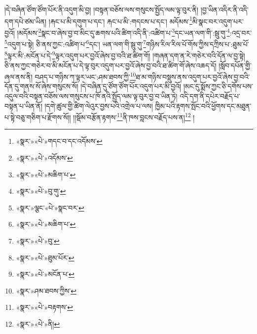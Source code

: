 །དེ་བཞིན་ཙོག་ཙོག་པོར་ནི་འདུག་མི་བྱ། །བསྟན་བཅོས་ལས་གསུངས་སྤྱོད་ལམ་ལྟ་བུར་ནི། །བྱ་ཡིན་འདིར་ནི་འདི་དག་དཔེ་ཙམ་ཡིན། །རྐང་པ་མི་དགུག་པ་དང་། རྐང་པ་མི་:གདངས་པ་དང་། མདོམས་\footnote{«སྣར་»«པེ་»གདང་བ་དང་འདོམས་}མི་སྣང་བར་འདུག་པར་བྱའོ། །མདོམས་\footnote{«སྣར་»«པེ་»འདོམས་}སྣང་བ་ཞེས་བྱ་བ་མིང་དུ་ཆགས་པའི་ཚིག་འདི་ནི་:འཚིག་པ་\footnote{«སྣར་»«པེ་»མཆིག་པ་}དང་ཡན་ལག་གི་:སྦུ་གུ་\footnote{«སྣར་»«པེ་»བུ་གུ་}:འདྲ་བར་\footnote{«སྣར་»ལྕང་«པེ་»སྣང་བར་}འདུག་པ་སྟེ། ཅི་ནས་ཀྱང་:འཚིག་པ་\footnote{«སྣར་»«པེ་»མཆིག་པ་}དང་། ཡན་ལག་གི་སྦུ་གུ་\footnote{«སྣར་»«པེ་»བུ་}གཉིས་རིལ་རིལ་པོ་གོས་ཀྱིས་དཀྲིས་པ་:ཐུམ་པོ་\footnote{«སྣར་»«པེ་»ཐུམ་པོར་}ལྟར་མི་:མངོན་པ་དེ་\footnote{«སྣར་»«པེ་»མངོན་པ་}ལྟར་འདུག་པར་བྱའོ་ཞེས་བྱ་བའི་ཐ་ཚིག་གོ། །གཞན་དག་ན་རེ་གཅེར་བའི་དོན་ལ་བྱ་སྟེ། ཅི་ནས་ཀྱང་གཅེར་བ་མི་མངོན་པ་དེ་ལྟ་བུར་འདུག་པར་བྱའོ་ཞེས་བྱ་བའི་ཐ་ཚིག་གོ་ཞེས་འཆད་དོ། །སློབ་དཔོན་གྱི་ཞལ་ནས་ནི། བཤད་པ་གཉིས་ཀ་ལྟར་ཡང་:ཤམ་ཐབས་ཀྱི་\footnote{«སྣར་»ཤམ་ཐབས་ཀྱིས་}ཐ་མ་གཉིས་བསྡུས་ནས་འདུག་པར་བྱའོ་ཞེས་བྱ་བའི་དོན་དུ་གནས་སོ་ཞེས་གསུངས་སོ། །དེ་བཞིན་དུ་ཙོག་ཙོག་པོར་འདུག་པར་མི་བྱའོ། །མང་དུ་སྨོས་ཀྱང་ཅི་དགོས་པས་འདུལ་བའི་བསྟན་བཅོས་ལས་གསུངས་པ་ཁོ་ནའི་སྤྱོད་ལམ་ལྟ་བུར་བྱ་བ་ཡིན་ཏེ། འདི་དག་ནི་དཔེར་བརྗོད་པ་བསྟན་པ་ཡིན་ནོ། །དགེ་ཚུལ་གྱི་ཚིག་ལེའུར་བྱས་པའི་འགྲེལ་པ་ལས། ཁྱིམ་པའི་རྟགས་སྤོང་བའི་ཕྱོགས་དང་མཐུན་པ་སྟེ་བཅུ་གཅིག་པ་རྫོགས་སོ།། །།སྡོམ་བརྩོན་རྟགས་\footnote{«སྣར་»«པེ་»བརྟགས་}ནི་ཁས་བླངས་བརྗོད་པས་ན།\footnote{«སྣར་»«པེ་»ནི།} །
